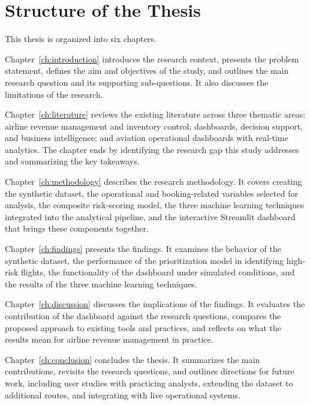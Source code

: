 \section{Structure of the Thesis}
\label{sec:structure}

This thesis is organized into six chapters.

Chapter~\ref{ch:introduction} introduces the research context, presents the problem statement, defines the aim and objectives of the study, and outlines the main research question and its supporting sub-questions. It also discusses the limitations of the research.

Chapter~\ref{ch:literature} reviews the existing literature across three thematic areas: airline revenue management and inventory control; dashboards, decision support, and business intelligence; and aviation operational dashboards with real-time analytics. The chapter ends by identifying the research gap this study addresses and summarizing the key takeaways.

Chapter~\ref{ch:methodology} describes the research methodology. It covers creating the synthetic dataset, the operational and booking-related variables selected for analysis, the composite risk-scoring model, the three machine learning techniques integrated into the analytical pipeline, and the interactive Streamlit dashboard that brings these components together.

Chapter~\ref{ch:findings} presents the findings. It examines the behavior of the synthetic dataset, the performance of the prioritization model in identifying high-risk flights, the functionality of the dashboard under simulated conditions, and the results of the three machine learning techniques.

Chapter~\ref{ch:discussion} discusses the implications of the findings. It evaluates the contribution of the dashboard against the research questions, compares the proposed approach to existing tools and practices, and reflects on what the results mean for airline revenue management in practice.

Chapter~\ref{ch:conclusion} concludes the thesis. It summarizes the main contributions, revisits the research questions, and outlines directions for future work, including user studies with practicing analysts, extending the dataset to additional routes, and integrating with live operational systems.
